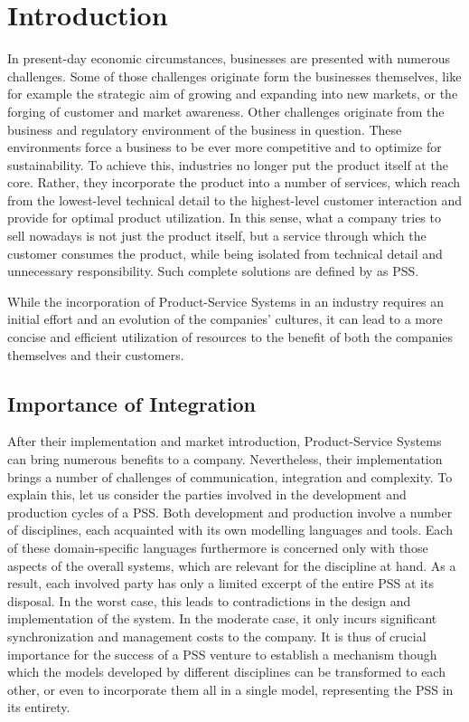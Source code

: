 \chapter{Introduction}
\label{chap:intro}

In present-day economic circumstances, businesses are presented with numerous challenges. Some of those challenges originate form the businesses themselves, like for example the strategic aim of growing and expanding into new markets, or the forging of customer and market awareness. Other challenges originate from the business and regulatory environment of the business in question. These environments force a business to be ever more competitive and to optimize for sustainability. To achieve this, industries no longer put the product itself at the core. Rather, they incorporate the product into a number of services, which reach from the lowest-level technical detail to the highest-level customer interaction and provide for optimal product utilization. In this sense, what a company tries to sell nowadays is not just the product itself, but a service through which the customer consumes the product, while being isolated from technical detail and unnecessary responsibility. Such complete solutions are defined by \cite{ref:schenkl} as \gls{PSS}.

While the incorporation of Product-Service Systems in an industry requires an initial effort and an evolution of the companies' cultures, it can lead to a more concise and efficient utilization of resources to the benefit of both the companies themselves and their customers. 

\section*{Importance of Integration}

After their implementation and market introduction, Product-Service Systems can bring numerous benefits to a company. Nevertheless, their implementation brings a number of challenges of communication, integration and complexity. To explain this, let us consider the parties involved in the development and production cycles of a \gls{PSS}. Both development and production involve a number of disciplines, each acquainted with its own modelling languages and tools. Each of these domain-specific languages furthermore is concerned only with those aspects of the overall systems, which are relevant for the discipline at hand. As a result, each involved party has only a limited excerpt of the entire \gls{PSS} at its disposal. In the worst case, this leads to contradictions in the design and implementation of the system. In the moderate case, it only incurs significant synchronization and management costs to the company. It is thus of crucial importance for the success of a PSS venture to establish a mechanism though which the models developed by different disciplines can be transformed to each other, or even to incorporate them all in a single model, representing the \gls{PSS} in its entirety.

